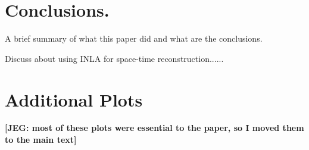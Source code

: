 \documentclass[11pt]{amsart}
\theoremstyle{plain}
\theoremstyle{definition}
\theoremstyle{remark}
\newcommand{\jeg}[1]{\color{ProcessBlue}\textbf{[JEG: #1]}\normalcolor}
\begin{document}








\section{Conclusions.}
\label{sec:conclusions}

A brief summary of what this paper did and what are the conclusions. 

Discuss about using INLA for space-time reconstruction......







\newpage
\appendix

\section{Additional Plots}
\jeg{most of these plots were essential to the paper, so I moved them to the main text}
\end{document}
